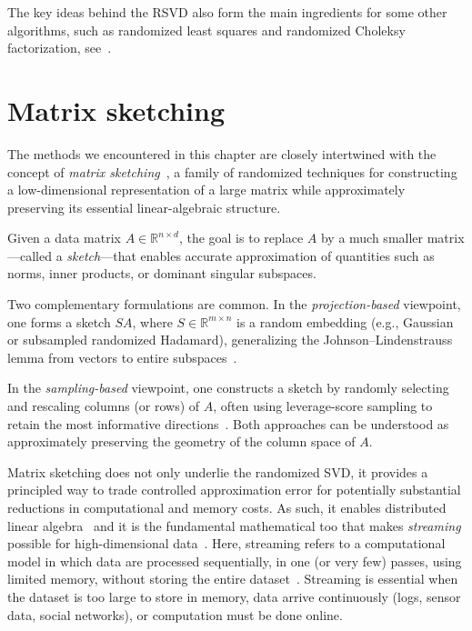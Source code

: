 The key ideas behind the RSVD also form the main ingredients for some other algorithms, such as randomized least squares and randomized Choleksy factorization, see~\cite{rokhlin2008fast,HMT11,KireevaTropp}.

\section{Matrix sketching}\label{s:sketching}

The methods we encountered in this chapter are closely intertwined with the concept of {\em matrix sketching}~\cite{liberty2013simple,mahoney2011randomized,rudelson2007sampling,HMT11}, a family of randomized techniques for constructing a low-dimensional representation of a large matrix while approximately preserving its essential linear-algebraic structure. 

Given a data matrix $A \in \mathbb{R}^{n \times d}$, the goal is to replace $A$ by a much smaller matrix—called a {\em sketch}---that enables accurate approximation of quantities such as norms, inner products, or dominant singular subspaces. 

Two complementary formulations are common. In the {\em projection-based} viewpoint, one forms a sketch $SA$, where $S \in \mathbb{R}^{m \times n}$ is a random embedding (e.g., Gaussian or subsampled randomized Hadamard), generalizing the Johnson–Lindenstrauss lemma from vectors to entire subspaces~\cite{woodruff2014sketching,tropp2017practical}. 

In the {\em sampling-based} viewpoint, one constructs a sketch by randomly selecting and rescaling columns (or rows) of $A$, often using leverage-score sampling to retain the most informative directions~\cite{frieze2004fast,mahoney2009cur,drineas2006subspace}. Both approaches can be understood as approximately preserving the geometry of the column space of $A$. 

Matrix sketching does not only underlie the randomized SVD, it provides a principled way to trade controlled approximation error for potentially substantial reductions in computational and memory costs. As such, it enables distributed linear algebra~\cite{woodruff2014sketching} and it is the fundamental mathematical too that makes {\em streaming} possible for high-dimensional data~\cite{harvey2008sketching,mahoney2011randomized}. Here, streaming refers to a computational model in which data are processed sequentially, in one (or very few) passes, using limited memory, without storing the entire dataset~\cite{muthukrishnan2005data,woodruff2014sketching}. Streaming is essential when
the dataset is too large to store in memory,
data arrive continuously (logs, sensor data, social networks), or computation must be done online.

